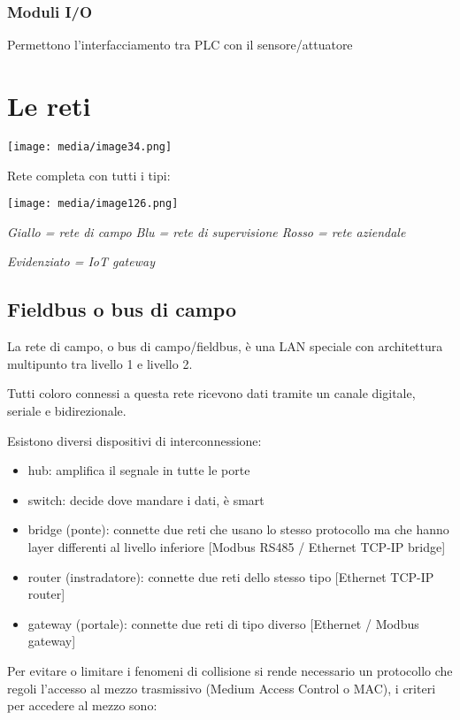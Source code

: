 \subsubsection{Moduli I/O}\label{moduli-io}

Permettono l'interfacciamento tra PLC con il sensore/attuatore

\section{Le reti}\label{le-reti}

\texttt{[image: media/image34.png]}

Rete completa con tutti i tipi:

\texttt{[image: media/image126.png]}

\emph{Giallo = rete di campo Blu = rete di supervisione Rosso = rete
aziendale}

\emph{Evidenziato = IoT gateway}

\subsection{Fieldbus o bus di campo}\label{fieldbus-o-bus-di-campo}

La rete di campo, o bus di campo/fieldbus, è una LAN speciale con
architettura multipunto tra livello 1 e livello 2.

Tutti coloro connessi a questa rete ricevono dati tramite un canale
digitale, seriale e bidirezionale.

Esistono diversi dispositivi di interconnessione:

\begin{itemize}
\item
  hub: amplifica il segnale in tutte le porte
\item
  switch: decide dove mandare i dati, è smart
\item
  bridge (ponte): connette due reti che usano lo stesso protocollo ma
  che hanno layer differenti al livello inferiore {[}Modbus RS485 /
  Ethernet TCP-IP bridge{]}
\item
  router (instradatore): connette due reti dello stesso tipo {[}Ethernet
  TCP-IP router{]}
\item
  gateway (portale): connette due reti di tipo diverso {[}Ethernet /
  Modbus gateway{]}
\end{itemize}

Per evitare o limitare i fenomeni di collisione si rende necessario un
protocollo che regoli l'accesso al mezzo trasmissivo (Medium Access
Control o MAC), i criteri per accedere al mezzo sono:

